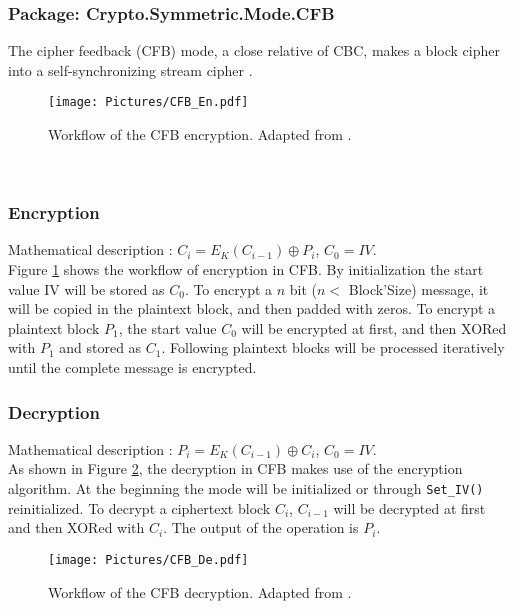 \subsubsection*{Package: Crypto.Symmetric.Mode.CFB}
The cipher feedback (CFB) mode, a close relative of CBC, makes a block cipher into a self-synchronizing stream cipher \cite{DBLP:reference/crypt/2011}.
\begin{figure}[htp]
\center
\texttt{[image: Pictures/CFB\_En.pdf]} 
\caption{Workflow of the CFB encryption. Adapted from \cite{DBLP:reference/crypt/2011}.}\label{CFBEN}
\center
\end{figure}\\
\subsubsection*{Encryption}
Mathematical description : $C_i=E_K(C_{i-1})\oplus P_i$, $C_0=IV$.\\
Figure \ref{CFBEN} shows the workflow of encryption in CFB. By initialization the start value IV will be stored as $C_0$. To encrypt a $n$ bit ($n<$ Block'Size) message, it will be copied in the plaintext block, and then padded with zeros. To encrypt a plaintext block $P_1$, the start value $C_0$ will be encrypted at first, and then XORed with $P_1$ and stored as $C_1$. Following plaintext blocks will be processed iteratively until the complete message is encrypted.
\subsubsection*{Decryption}
Mathematical description : $P_i=E_K(C_{i-1})\oplus C_i$, $C_0=IV$.\\
As shown in Figure \ref{CFBDE}, the decryption in CFB makes use of the encryption algorithm. At the beginning the mode will be initialized or through \texttt{Set\_IV()} reinitialized. To decrypt a ciphertext block $C_i$, $C_{i-1}$ will be decrypted at first and then XORed with $C_i$. The output of the operation is $P_i$.
\begin{figure}[h]
\centering
\texttt{[image: Pictures/CFB\_De.pdf]} 
\caption{Workflow of the CFB decryption. Adapted from \cite{DBLP:reference/crypt/2011}.} \label{CFBDE}
\end{figure}
